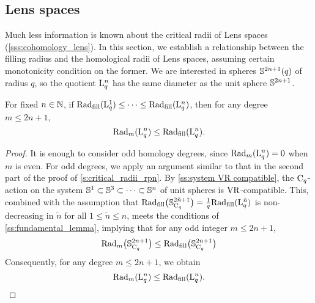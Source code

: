 \subsection{Lens spaces}\label{s:critical_radii_lens}

Much less information is known about the critical radii of Lens spaces (\cref{sss:cohomology_lens}).
In this section, we establish a relationship between the filling radius and the homological radii of Lens spaces, assuming certain monotonicity condition on the former.
We are interested in spheres \(\mathbb{S}^{2n+1}(q)\) of radius \(q\), so the quotient \(\mathrm{L}_q^n\) has the same diameter as the unit sphere \(\mathbb{S}^{2n+1}\).

\lemma
For fixed $n\in \mathbb{N}$, if $\mathrm{Rad}_{\mathrm{fill}}(\mathrm{L}^1_q) \leq \dotsb \leq \mathrm{Rad}_{\mathrm{fill}}(\mathrm{L}^n_q)$, then for any degree $m\leq 2n+1$,
\[
\mathrm{Rad}_{m}(\mathrm{L}^n_q) \leq \mathrm{Rad}_{\mathrm{fill}}(\mathrm{L}^n_q).
\]

\begin{proof}
	It is enough to consider odd homology degrees, since $\mathrm{Rad}_{m}(\mathrm{L}^n_q) = 0$ when $m$ is even.
	For odd degrees, we apply an argument similar to that in the second part of the proof of \cref{s:critical_radii_rpn}.
	By \cref{ss:system VR compatible}, the $\mathrm{C}_q$-action on the system $\mathbb{S}^1 \subset \mathbb{S}^3 \subset \dotsb \subset \mathbb{S}^n$ of unit spheres is \(\mathrm{VR}\)-compatible.
	This, combined with the assumption that $\mathrm{Rad}_{\mathrm{fill}}\big(\mathbb{S}^{2\tilde{n}+1}_{\mathrm{C}_q}\big) = \tfrac{1}{q} \mathrm{Rad}_{\mathrm{fill}}(\mathrm{L}^{\tilde{n}}_q)$ is non-decreasing in $\tilde{n}$ for all $1\leq \tilde{n} \leq n$, meets the conditions of \cref{ss:fundamental_lemma}, implying that for any odd integer $m \leq 2n+1$,
	\[
	\mathrm{Rad}_m\big(\mathbb{S}^{2n+1}_{\mathrm{C}_q}\big) \leq \mathrm{Rad}_{\mathrm{fill}}\big(\mathbb{S}^{2n+1}_{\mathrm{C}_q}\big)
	\]
	Consequently, for any degree $m \leq 2n+1$, we obtain
	\[
	\mathrm{Rad}_{m}(\mathrm{L}^n_q) \leq \mathrm{Rad}_{\mathrm{fill}}(\mathrm{L}^n_q). \qedhere
	\]
\end{proof}